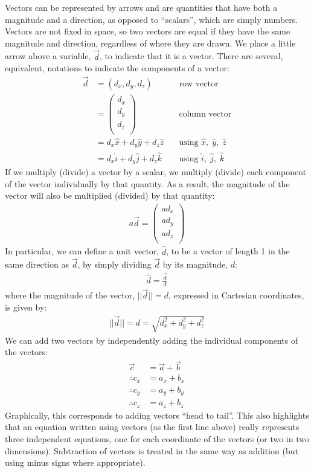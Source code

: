 Vectors can be represented by arrows and are quantities that have both a magnitude and a direction, as opposed to ``scalars'', which are simply numbers. Vectors are not fixed in space, so two vectors are equal if they have the same magnitude and direction, regardless of where they are drawn. We place a little arrow above a variable, $\vec d$, to indicate that it is a vector. There are several, equivalent, notations to indicate the components of a vector:
\begin{align*}
\vec d &= (d_x,d_y, d_z)\quad&\text{row vector}\\
       &=\begin{pmatrix}
           d_x \\
           d_y \\
           d_z\\
         \end{pmatrix}\quad&\text{column vector}\\
         &= d_x\hat x +d_y \hat y +d_z \hat z\quad&\text{using }\hat x,\;\hat y,\;\hat z\\
         &=d_x\hat i +d_y \hat j+d_z \hat k \quad&\text{using }\hat i,\;\hat j,\;\hat k
\end{align*}
If we multiply (divide) a vector by a scalar, we multiply (divide) each component of the vector individually by that quantity. As a result, the magnitude of the vector will also be multiplied (divided) by that quantity:
\begin{align*}
a\vec d = \begin{pmatrix}
           ad_x \\
           ad_y \\
           ad_z \\
         \end{pmatrix}
\end{align*}
In particular, we can define a unit vector, $\hat d$, to be a vector of length 1 in the same direction as $\vec d$, by simply dividing $\vec d$ by its magnitude, $d$:
\begin{align*}
\hat d = \frac{\vec d}{d}
\end{align*}
where the magnitude of the vector, $||\vec d|| = d$, expressed in Cartesian coordinates, is given by:
\begin{align*}
||\vec d|| = d =\sqrt{d_x^2+d_y^2+d_z^2}
\end{align*}
We can add two vectors by independently adding the individual components of the vectors:
\begin{align*}
\vec c &= \vec a + \vec b\\
\therefore c_x &= a_x + b_x\\
\therefore c_y &= a_y + b_y\\
\therefore c_z &= a_z + b_z
\end{align*}
Graphically, this corresponds to adding vectors ``head to tail''. This also highlights that an equation written using vectors (as the first line above) really represents three independent equations, one for each coordinate of the vectors (or two in two dimensions). Subtraction of vectors is treated in the same way as addition (but using minus signs where appropriate).

